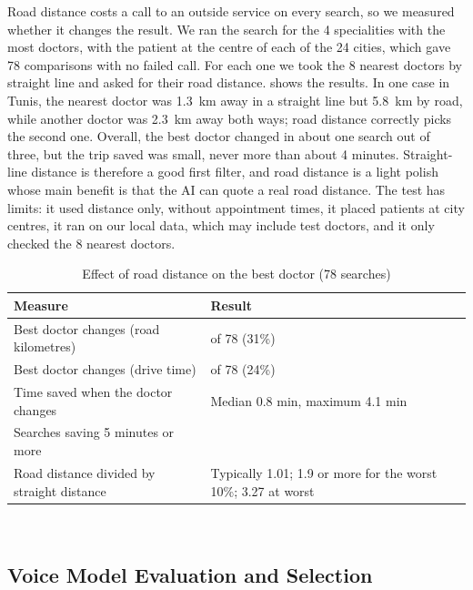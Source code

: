 Road distance costs a call to an outside service on every search, so we measured whether it changes the result. We ran the search for the 4 specialities with the most doctors, with the patient at the centre of each of the 24 cities, which gave 78 comparisons with no failed call. For each one we took the 8 nearest doctors by straight line and asked for their road distance.  shows the results. In one case in Tunis, the nearest doctor was 1.3~km away in a straight line but 5.8~km by road, while another doctor was 2.3~km away both ways; road distance correctly picks the second one. Overall, the best doctor changed in about one search out of three, but the trip saved was small, never more than about 4 minutes. Straight-line distance is therefore a good first filter, and road distance is a light polish whose main benefit is that the AI can quote a real road distance. The test has limits: it used distance only, without appointment times, it placed patients at city centres, it ran on our local data, which may include test doctors, and it only checked the 8 nearest doctors.

\begin{table}[H]
    \centering
    \caption{Effect of road distance on the best doctor (78 searches)}
    \label{tab:road-distance}
    \small
    \begin{tabular}{>{\raggedright\arraybackslash}p{\dimexpr 0.5385\dimexpr\textwidth-4\tabcolsep\relax\relax}>{\raggedright\arraybackslash}p{\dimexpr 0.4615\dimexpr\textwidth-4\tabcolsep\relax\relax}}
        \toprule
        \textbf{Measure} & \textbf{Result} \\
        \midrule
        Best doctor changes (road kilometres) & 24 of 78 (31\%) \\
        Best doctor changes (drive time) & 19 of 78 (24\%) \\
        Time saved when the doctor changes & Median 0.8 min, maximum 4.1 min \\
        Searches saving 5 minutes or more & 0 \\
        Road distance divided by straight distance & Typically 1.01; 1.9 or more for the worst 10\%; 3.27 at worst \\
        \bottomrule
    \end{tabular}
    \\[0.2cm]
\end{table}

\subsection{Voice Model Evaluation and Selection}
\label{subsec:voice-model-evaluation}

